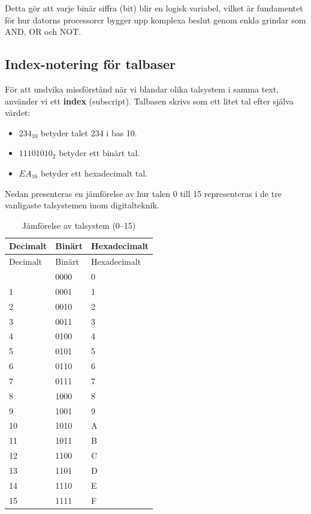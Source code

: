 \documentclass[
  swedish,
  letterpaper,
  oneside,
  openany]{book}
\providecommand{\tightlist}{%
  \setlength{\itemsep}{0pt}\setlength{\parskip}{0pt}}
\begin{document}
Detta gör att varje binär siffra (bit) blir en logisk variabel, vilket
är fundamentet för hur datorns processorer bygger upp komplexa beslut
genom enkla grindar som AND, OR och NOT.

\subsection{Index-notering för
talbaser}\label{index-notering-fuxf6r-talbaser}

För att undvika missförstånd när vi blandar olika talsystem i samma
text, använder vi ett \textbf{index} (subscript). Talbasen skrivs som
ett litet tal efter själva värdet:

\begin{itemize}
\tightlist
\item
  \(234_{10}\) betyder talet 234 i bas 10.
\item
  \(11101010_2\) betyder ett binärt tal.
\item
  \(EA_{16}\) betyder ett hexadecimalt tal.
\end{itemize}

Nedan presenteras en jämförelse av hur talen 0 till 15 representeras i
de tre vanligaste talsystemen inom digitalteknik.

\begin{longtable}[]{@{}lll@{}}
\caption{Jämförelse av talsystem
(0--15)}\label{tbl-talsystem}\tabularnewline
\toprule\noalign{}
Decimalt & Binärt & Hexadecimalt \\
\midrule\noalign{}
\endfirsthead
\toprule\noalign{}
Decimalt & Binärt & Hexadecimalt \\
\midrule\noalign{}
\endhead
\bottomrule\noalign{}
\endlastfoot
0 & 0000 & 0 \\
1 & 0001 & 1 \\
2 & 0010 & 2 \\
3 & 0011 & 3 \\
4 & 0100 & 4 \\
5 & 0101 & 5 \\
6 & 0110 & 6 \\
7 & 0111 & 7 \\
8 & 1000 & 8 \\
9 & 1001 & 9 \\
10 & 1010 & A \\
11 & 1011 & B \\
12 & 1100 & C \\
13 & 1101 & D \\
14 & 1110 & E \\
15 & 1111 & F \\
\end{longtable}
\end{document}
